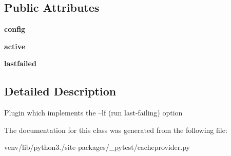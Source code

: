 \subsection*{Public Attributes}
\begin{DoxyCompactItemize}
\item 
\mbox{\label{class__pytest_1_1cacheprovider_1_1_l_f_plugin_a63a9122fe14a5e3b44c10627bed8f2db}} 
{\bfseries config}
\item 
\mbox{\label{class__pytest_1_1cacheprovider_1_1_l_f_plugin_a8b93a7e68373d5364494addae2e82235}} 
{\bfseries active}
\item 
\mbox{\label{class__pytest_1_1cacheprovider_1_1_l_f_plugin_af7237795a6db32c7bfc2d65bd14ae053}} 
{\bfseries lastfailed}
\end{DoxyCompactItemize}


\subsection{Detailed Description}
\begin{DoxyVerb}Plugin which implements the --lf (run last-failing) option \end{DoxyVerb}
 

The documentation for this class was generated from the following file\+:\begin{DoxyCompactItemize}
\item 
venv/lib/python3./site-\/packages/\+\_\+pytest/cacheprovider.\+py\end{DoxyCompactItemize}
